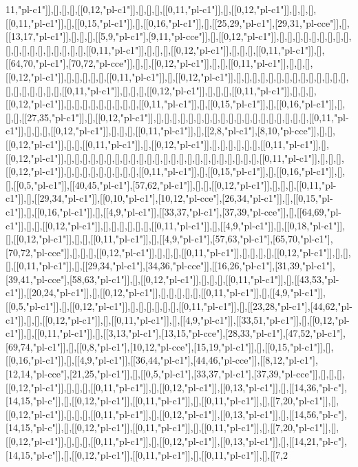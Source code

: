 11,"pl-c1"]],[],[],[],[[0,12,"pl-c1"]],[],[],[],[[0,11,"pl-c1"]],[],[[0,12,"pl-c1"]],[],[],[],[[0,11,"pl-c1"]],[],[[0,15,"pl-c1"]],[],[[0,16,"pl-c1"]],[],[[25,29,"pl-c1"],[29,31,"pl-cce"]],[],[[13,17,"pl-c1"]],[],[],[],[[5,9,"pl-c1"],[9,11,"pl-cce"]],[],[[0,12,"pl-c1"]],[],[],[],[],[],[],[],[],[],[],[],[],[],[],[],[],[],[],[],[[0,11,"pl-c1"]],[],[],[],[[0,12,"pl-c1"]],[],[],[],[[0,11,"pl-c1"]],[],[[64,70,"pl-c1"],[70,72,"pl-cce"]],[],[],[[0,12,"pl-c1"]],[],[],[[0,11,"pl-c1"]],[],[],[],[[0,12,"pl-c1"]],[],[],[],[],[],[[0,11,"pl-c1"]],[],[[0,12,"pl-c1"]],[],[],[],[],[],[],[],[],[],[],[],[],[],[],[],[],[],[],[],[],[],[[0,11,"pl-c1"]],[],[],[],[[0,12,"pl-c1"]],[],[],[],[[0,11,"pl-c1"]],[],[],[],[[0,12,"pl-c1"]],[],[],[],[],[],[],[],[],[],[[0,11,"pl-c1"]],[],[[0,15,"pl-c1"]],[],[[0,16,"pl-c1"]],[],[],[],[[27,35,"pl-c1"]],[],[[0,12,"pl-c1"]],[],[],[],[],[],[],[],[],[],[],[],[],[],[],[],[],[],[],[],[[0,11,"pl-c1"]],[],[],[],[[0,12,"pl-c1"]],[],[],[],[[0,11,"pl-c1"]],[],[[2,8,"pl-c1"],[8,10,"pl-cce"]],[],[],[[0,12,"pl-c1"]],[],[],[[0,11,"pl-c1"]],[],[[0,12,"pl-c1"]],[],[],[],[],[],[],[[0,11,"pl-c1"]],[],[[0,12,"pl-c1"]],[],[],[],[],[],[],[],[],[],[],[],[],[],[],[],[],[],[],[],[],[],[],[],[],[[0,11,"pl-c1"]],[],[],[],[[0,12,"pl-c1"]],[],[],[],[],[],[],[],[],[],[[0,11,"pl-c1"]],[],[[0,15,"pl-c1"]],[],[[0,16,"pl-c1"]],[],[],[[0,5,"pl-c1"]],[[40,45,"pl-c1"],[57,62,"pl-c1"]],[],[],[[0,12,"pl-c1"]],[],[],[],[[0,11,"pl-c1"]],[],[[29,34,"pl-c1"]],[[0,10,"pl-c1"],[10,12,"pl-cce"],[26,34,"pl-c1"]],[],[[0,15,"pl-c1"]],[],[[0,16,"pl-c1"]],[],[[4,9,"pl-c1"]],[[33,37,"pl-c1"],[37,39,"pl-cce"]],[],[[64,69,"pl-c1"]],[],[],[[0,12,"pl-c1"]],[],[],[],[],[],[],[[0,11,"pl-c1"]],[],[[4,9,"pl-c1"]],[],[[0,18,"pl-c1"]],[],[[0,12,"pl-c1"]],[],[],[[0,11,"pl-c1"]],[],[[4,9,"pl-c1"],[57,63,"pl-c1"],[65,70,"pl-c1"],[70,72,"pl-cce"]],[],[],[],[[0,12,"pl-c1"]],[],[],[],[[0,11,"pl-c1"]],[],[],[],[],[[0,12,"pl-c1"]],[],[],[],[[0,11,"pl-c1"]],[],[[29,34,"pl-c1"],[34,36,"pl-cce"]],[[16,26,"pl-c1"],[31,39,"pl-c1"],[39,41,"pl-cce"],[58,63,"pl-c1"]],[],[[0,12,"pl-c1"]],[],[],[],[[0,11,"pl-c1"]],[],[[43,53,"pl-c1"]],[[20,24,"pl-c1"]],[],[[0,12,"pl-c1"]],[],[],[],[],[],[[0,11,"pl-c1"]],[],[[4,9,"pl-c1"]],[[0,5,"pl-c1"]],[],[[0,12,"pl-c1"]],[],[],[],[],[],[],[[0,11,"pl-c1"]],[],[[23,28,"pl-c1"],[44,62,"pl-c1"]],[],[],[[0,12,"pl-c1"]],[],[[0,11,"pl-c1"]],[],[[4,9,"pl-c1"]],[[33,51,"pl-c1"]],[],[[0,12,"pl-c1"]],[],[[0,11,"pl-c1"]],[],[[3,13,"pl-c1"],[13,15,"pl-cce"],[28,33,"pl-c1"],[47,52,"pl-c1"],[69,74,"pl-c1"]],[],[[0,8,"pl-c1"],[10,12,"pl-cce"],[15,19,"pl-c1"]],[],[[0,15,"pl-c1"]],[],[[0,16,"pl-c1"]],[],[[4,9,"pl-c1"]],[[36,44,"pl-c1"],[44,46,"pl-cce"]],[[8,12,"pl-c1"],[12,14,"pl-cce"],[21,25,"pl-c1"]],[],[[0,5,"pl-c1"],[33,37,"pl-c1"],[37,39,"pl-cce"]],[],[],[],[[0,12,"pl-c1"]],[],[],[],[[0,11,"pl-c1"]],[],[[0,12,"pl-c1"]],[[0,13,"pl-c1"]],[],[[14,36,"pl-c"],[14,15,"pl-c"]],[],[[0,12,"pl-c1"]],[[0,11,"pl-c1"]],[],[[0,11,"pl-c1"]],[],[[7,20,"pl-c1"]],[],[[0,12,"pl-c1"]],[],[],[],[[0,11,"pl-c1"]],[],[[0,12,"pl-c1"]],[[0,13,"pl-c1"]],[],[[14,56,"pl-c"],[14,15,"pl-c"]],[],[[0,12,"pl-c1"]],[[0,11,"pl-c1"]],[],[[0,11,"pl-c1"]],[],[[7,20,"pl-c1"]],[],[[0,12,"pl-c1"]],[],[],[],[[0,11,"pl-c1"]],[],[[0,12,"pl-c1"]],[[0,13,"pl-c1"]],[],[[14,21,"pl-c"],[14,15,"pl-c"]],[],[[0,12,"pl-c1"]],[[0,11,"pl-c1"]],[],[[0,11,"pl-c1"]],[],[[7,2